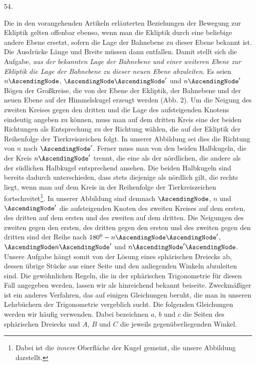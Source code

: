 \par\medskip
{}
\begin{center}54.\end{center}
Die in den vorangehenden Artikeln erläuterten Beziehungen der Bewegung zur Ekliptik gelten offenbar ebenso, wenn man die Ekliptik durch eine beliebige andere Ebene ersetzt, sofern die Lage der Bahnebene zu dieser Ebene bekannt ist. Die Ausdrücke Länge und Breite müssen dann entfallen. Damit stellt sich die Aufgabe, \textit{aus der bekannten Lage der Bahnebene und einer weiteren Ebene zur Ekliptik die Lage der Bahnebene zu dieser neuen Ebene abzuleiten.} Es seien $n\AscendingNode$, $\AscendingNode\AscendingNode'$ und $n\AscendingNode'$ Bögen der Großkreise, die von der Ebene der Ekliptik, der Bahnebene und der neuen Ebene auf der Himmelskugel erzeugt werden (Abb. 2). Um die Neigung des zweiten Kreises gegen den dritten und die Lage des aufsteigenden Knotens eindeutig angeben zu können, muss man auf dem dritten Kreis eine der beiden Richtungen als Entsprechung zu der Richtung wählen, die auf der Ekliptik der Reihenfolge der Tierkreiszeichen folgt. In unserer Abbildung sei dies die Richtung von $n$ nach $\AscendingNode'$. Ferner muss man von den beiden Halbkugeln, die der Kreis $n\AscendingNode'$ trennt, die eine als der nördlichen, die andere als der südlichen Halbkugel entsprechend ansehen. Die beiden Halbkugeln sind bereits dadurch unterschieden, dass stets diejenige als nördlich gilt, die rechts liegt, wenn man auf dem Kreis in der Reihenfolge der Tierkreiszeichen fortschreitet\footnote{Dabei ist die \textit{innere} Oberfläche der Kugel gemeint, die unsere Abbildung darstellt.}. In unserer Abbildung sind demnach $\AscendingNode$, $n$ und $\AscendingNode'$ die aufsteigenden Knoten des zweiten Kreises auf dem ersten, des dritten auf dem ersten und des zweiten auf dem dritten. Die Neigungen des zweiten gegen den ersten, des dritten gegen den ersten und des zweiten gegen den dritten sind der Reihe nach $180^0-n\AscendingNode\AscendingNode'$, $\AscendingNode n\AscendingNode'$ und $n\AscendingNode'\AscendingNode$. Unsere Aufgabe hängt somit von der Lösung eines sphärischen Dreiecks ab, dessen übrige Stücke aus einer Seite und den anliegenden Winkeln abzuleiten sind. Die gewöhnlichen Regeln, die in der sphärischen Trigonometrie für diesen Fall angegeben werden, lassen wir als hinreichend bekannt beiseite. Zweckmäßiger ist ein anderes Verfahren, das auf einigen Gleichungen beruht, die man in unseren Lehrbüchern der Trigonometrie vergeblich sucht. Die folgenden Gleichungen werden wir häufig verwenden. Dabei bezeichnen $a$, $b$ und $c$ die Seiten des sphärischen Dreiecks und $A$, $B$ und $C$ die jeweils gegenüberliegenden Winkel.\HistoricalNoteDouble{Handschriftliche Bemerkung:] Haben zwei Dreiecke die beiden Seiten $b$ und $c$ gemeinsam, so gilt
}

